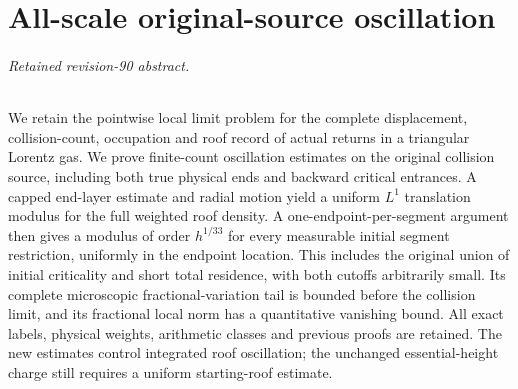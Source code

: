 \documentclass[11pt,reqno]{amsart}
\numberwithin{equation}{section}
\theoremstyle{definition}\newtheorem{definition}[theorem]{Definition}
\theoremstyle{remark}\newtheorem{remark}[theorem]{Remark}
\theoremstyle{definition}\newtheorem{inputstatement}[theorem]{Input statement}
\begin{document}
\endgroup
\part{All-scale original-source oscillation}
\begingroup
\let\ArchiveLabel\label
\let\ArchiveRef\ref
\renewcommand{\label}[1]{\ArchiveLabel{v90archive:#1}}
\renewcommand{\ref}[1]{%
  \IfBeginWith{#1}{supp-}{%
    \StrBehind{#1}{supp-}[\ArchiveTarget]%
    \ArchiveRef{\ArchiveTarget}%
  }{\ArchiveRef{v90archive:#1}}%
}
\makeatletter
\let\ltx@label\label
\makeatother
\paragraph{Retained revision-90 abstract.}

We retain the pointwise local limit problem for the complete displacement,
collision-count, occupation and roof record of actual returns in a
triangular Lorentz gas. We prove finite-count oscillation estimates on
the original collision source, including both true physical ends and
backward critical entrances. A capped end-layer estimate and radial
motion yield a uniform $L^1$ translation modulus for the full weighted
roof density. A one-endpoint-per-segment argument then gives a modulus
of order $h^{1/33}$ for every measurable initial segment restriction,
uniformly in the endpoint location. This includes the original union
of initial criticality and short total residence, with both cutoffs
arbitrarily small. Its complete microscopic fractional-variation tail
is bounded before the collision limit, and its fractional local norm
has a quantitative vanishing bound. All exact labels, physical weights,
arithmetic classes and previous proofs are retained. The new estimates
control integrated roof oscillation; the unchanged essential-height
charge still requires a uniform starting-roof estimate.




\end{document}
